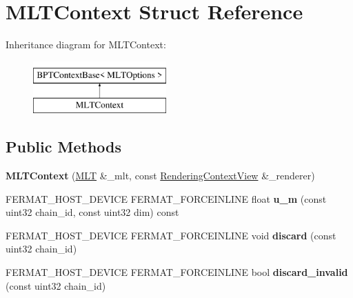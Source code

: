\hypertarget{struct_m_l_t_context}{}\section{M\+L\+T\+Context Struct Reference}
\label{struct_m_l_t_context}
Inheritance diagram for M\+L\+T\+Context\+:\begin{figure}[H]
\begin{center}
\leavevmode
\includegraphics[height=2.000000cm]{struct_m_l_t_context}
\end{center}
\end{figure}
\subsection*{Public Methods}
\begin{DoxyCompactItemize}
\item 
\mbox{\label{struct_m_l_t_context_a38b614856bb0029b5a63aeb29b5d2645}} 
{\bfseries M\+L\+T\+Context} (\hyperlink{struct_m_l_t}{M\+LT} \&\+\_\+mlt, const \hyperlink{struct_rendering_context_view}{Rendering\+Context\+View} \&\+\_\+renderer)
\item 
\mbox{\label{struct_m_l_t_context_a7c09b9fa48d021e14ecf3cb95fcb254b}} 
F\+E\+R\+M\+A\+T\+\_\+\+H\+O\+S\+T\+\_\+\+D\+E\+V\+I\+CE F\+E\+R\+M\+A\+T\+\_\+\+F\+O\+R\+C\+E\+I\+N\+L\+I\+NE float {\bfseries u\+\_\+m} (const uint32 chain\+\_\+id, const uint32 dim) const
\item 
\mbox{\label{struct_m_l_t_context_a35465071c4d049f16eacc4e5580f2a6f}} 
F\+E\+R\+M\+A\+T\+\_\+\+H\+O\+S\+T\+\_\+\+D\+E\+V\+I\+CE F\+E\+R\+M\+A\+T\+\_\+\+F\+O\+R\+C\+E\+I\+N\+L\+I\+NE void {\bfseries discard} (const uint32 chain\+\_\+id)
\item 
\mbox{\label{struct_m_l_t_context_a953b24804201345870f2a93ef87a6afa}} 
F\+E\+R\+M\+A\+T\+\_\+\+H\+O\+S\+T\+\_\+\+D\+E\+V\+I\+CE F\+E\+R\+M\+A\+T\+\_\+\+F\+O\+R\+C\+E\+I\+N\+L\+I\+NE bool {\bfseries discard\+\_\+invalid} (const uint32 chain\+\_\+id)
\end{DoxyCompactItemize}

